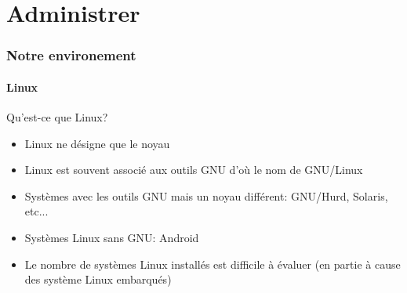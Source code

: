 %
%

\part{Administrer}

\begin{frame}
  \partpage
\end{frame}

\begin{frame}
  \tableofcontents[currentpart]
\end{frame}

\section{Notre environement}

\subsection{Linux}

\begin{frame}{Qu'est-ce que Linux?}
  \begin{itemize}
  \item  Linux ne désigne  que le  noyau
  \item  Linux est  souvent  associé aux  outils  GNU d'où  le nom  de
    GNU/Linux
  \item  Systèmes  avec  les  outils  GNU  mais  un  noyau  différent:
    GNU/Hurd, Solaris, etc...
  \item Systèmes Linux sans GNU: Android
  \item Le nombre de systèmes  Linux installés est difficile à évaluer
    (en partie à cause des système Linux embarqués)
  \end{itemize}
\end{frame}

